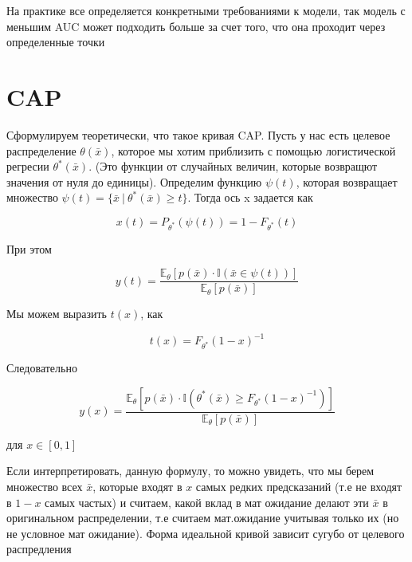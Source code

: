 \documentclass{article}
\begin{document}
        \quad

        На практике все определяется конкретными требованиями к модели, так модель с меньшим AUC может подходить больше за счет того, что она проходит через определенные точки

    \section{CAP}

    Сформулируем теоретически, что такое кривая CAP. 
    Пусть у нас есть целевое распределение $\theta(\bar{x})$, которое мы хотим приблизить с помощью 
    логистической регресии $\theta^{*}(\bar{x})$. (Это функции от случайных величин, которые возвращют значения от 
    нуля до единицы). Определим функцию $\psi(t)$, которая возвращает множество 
    $\psi(t) = \{\bar{x} \ | \ \theta^{*}(\bar{x}) \geq t   \}$. Тогда ось x задается как 

    \begin{equation}
        x(t) = P_{\theta^{*}}(\psi(t)) = 1 - F_{\theta^{*}}(t)
    \end{equation}

    При этом 

    \begin{equation}
        y(t) = \frac{\mathbb{E}_{\theta}[p(\bar{x}) \cdot \mathbb{I}(\bar{x} \in \psi(t)) ]}{\mathbb{E}_{\theta}[p(\bar{x})]}
    \end{equation}

    Мы можем выразить $t(x)$, как 

    \begin{equation}
        t(x) = F_{\theta^{*}}(1 - x)^{-1}
    \end{equation}

    Следовательно

    \begin{equation}
        y(x) = \frac{\mathbb{E}_{\theta}[p(\bar{x}) \cdot \mathbb{I}(\theta^{*}(\bar{x}) \geq F_{\theta^{*}}(1 - x)^{-1}) ]}{\mathbb{E}_{\theta}[p(\bar{x})]}
    \end{equation}

    для $x \in [0, 1]$

    \quad 

    Если интерпретировать, данную формулу, то можно увидеть, что мы берем множество всех 
    $\bar{x}$, которые входят в $x$ самых редких предсказаний (т.е не входят в $1 - x$ самых частых) 
    и считаем, какой вклад в мат ожидание делают эти $\bar{x}$ в оригинальном распределении, т.е считаем мат.ожидание учитывая только их 
    (но не условное мат ожидание). 
    Форма идеальной кривой зависит сугубо от целевого распредления
\end{document}
